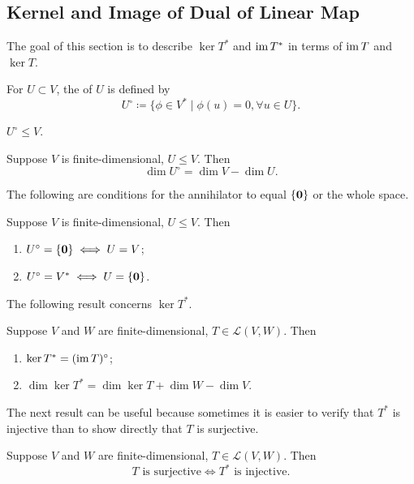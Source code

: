 \subsection{Kernel and Image of Dual of Linear Map}
The goal of this section is to describe $\ker T^*$ and $\operatorname{im} T^*$ in terms of $\operatorname{im} T$ and $\ker T$.

\begin{definition}[Annihilator]
For $U\subset V$, the  of $U$ is defined by
\[U^\circ\coloneqq\{\phi\in V^*\mid\phi(u)=0,\forall u\in U\}.\]
\end{definition}

\begin{proposition}
$U^\circ\le V$.
\end{proposition}

\begin{proposition}
Suppose $V$ is finite-dimensional, $U\le V$. Then
\[\dim U^\circ=\dim V-\dim U.\]
\end{proposition}

The following are conditions for the annihilator to equal $\{\vb{0}\}$ or the whole space.

\begin{proposition}
Suppose $V$ is finite-dimensional, $U\le V$. Then
\begin{enumerate}[label=(\roman*)]
\item $U^\circ=\{\vb{0}\}\iff U=V$;
\item $U^\circ=V^*\iff U=\{\vb{0}\}$.
\end{enumerate}
\end{proposition}

The following result concerns $\ker T^*$.

\begin{proposition}
Suppose $V$ and $W$ are finite-dimensional, $T\in\mathcal{L}(V,W)$. Then
\begin{enumerate}[label=(\roman*)]
\item $\ker T^*=(\operatorname{im} T)^\circ$;
\item $\dim\ker T^*=\dim\ker T+\dim W-\dim V$.
\end{enumerate}
\end{proposition}

The next result can be useful because sometimes it is easier to verify that $T^*$ is injective than to show directly that $T$ is surjective.

\begin{proposition}
Suppose $V$ and $W$ are finite-dimensional, $T\in\mathcal{L}(V,W)$. Then
\[T\text{ is surjective}\iff T^*\text{ is injective.}\]
\end{proposition}

